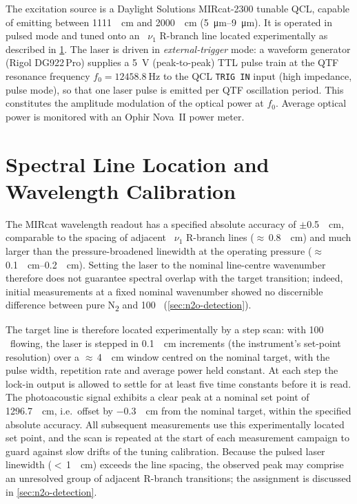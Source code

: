 The excitation source is a Daylight Solutions MIRcat-2300 tunable QCL, capable
of emitting between \SI{1111}{\per\centi\meter} and \SI{2000}{\per\centi\meter}
(\SIrange{5}{9}{\micro\meter}). It is operated in pulsed mode and tuned onto an
\nto\ $\nu_1$ R-branch line located experimentally as described in
\cref{sec:line-location}. The laser is driven in
\emph{external-trigger} mode: a waveform generator (Rigol DG922\,Pro) supplies a
\SI{5}{\volt} (peak-to-peak) TTL pulse train at the QTF resonance frequency
$f_0 = \SI{12458.8}{\hertz}$ to the QCL \texttt{TRIG IN} input (high impedance,
pulse mode), so that one laser pulse is emitted per QTF oscillation period. This
constitutes the amplitude modulation of the optical power at $f_0$. Average
optical power is monitored with an Ophir Nova~II power meter.

\section{Spectral Line Location and Wavelength Calibration}
\label{sec:line-location}

The MIRcat wavelength readout has a specified absolute accuracy of
$\pm$\SI{0.5}{\per\centi\meter}, comparable to the spacing of adjacent \nto\
$\nu_1$ R-branch lines ($\approx$\,\SI{0.8}{\per\centi\meter}) and much larger
than the pressure-broadened linewidth at the operating pressure
($\approx$\,\SIrange{0.1}{0.2}{\per\centi\meter}). Setting the laser to the
nominal line-centre wavenumber therefore does not guarantee spectral overlap
with the target transition; indeed, initial measurements at a fixed nominal
wavenumber showed no discernible difference between pure N\textsubscript{2}
and \SI{100}{\ppm} \nto\ (\cref{sec:n2o-detection}).

The target line is therefore located experimentally by a step scan: with
\SI{100}{\ppm} \nto\ flowing, the laser is stepped in
\SI{0.1}{\per\centi\meter} increments (the instrument's set-point resolution)
over a $\approx$\,\SI{4}{\per\centi\meter} window centred on the nominal
target, with the pulse width, repetition rate and average power held constant.
At each step the lock-in output is allowed to settle for at least five time
constants before it is read. The photoacoustic signal exhibits a clear peak at
a nominal set point of \SI{1296.7}{\per\centi\meter}, i.e.\ offset by
\SI{-0.3}{\per\centi\meter} from the nominal target, within the specified
absolute accuracy. All subsequent measurements use this experimentally located
set point, and the scan is repeated at the start of each measurement campaign
to guard against slow drifts of the tuning calibration. Because the pulsed
laser linewidth ($<$\,\SI{1}{\per\centi\meter}) exceeds the line spacing, the
observed peak may comprise an unresolved group of adjacent R-branch
transitions; the assignment is discussed in \cref{sec:n2o-detection}.

